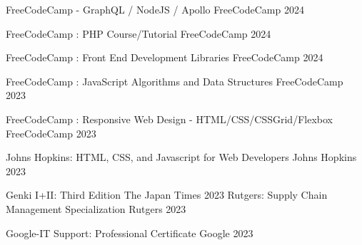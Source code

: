 

\begin{cvhonors}

  \cvhonor
    {FreeCodeCamp - GraphQL / NodeJS / Apollo} %
    {FreeCodeCamp} %
    {} %
    {2024} %

  \cvhonor
    {FreeCodeCamp : PHP Course/Tutorial} %
    {FreeCodeCamp} %
    {} %
    {2024} %

  \cvhonor
    {FreeCodeCamp : Front End Development Libraries} %
    {FreeCodeCamp} %
    {} %
    {2024} %

  \cvhonor
    {FreeCodeCamp : JavaScript Algorithms and Data Structures} %
    {FreeCodeCamp} %
    {} %
    {2023} %

  \cvhonor
    {FreeCodeCamp : Responsive Web Design - HTML/CSS/CSSGrid/Flexbox} %
    {FreeCodeCamp} %
    {} %
    {2023} %

  \cvhonor
    {Johns Hopkins: HTML, CSS, and Javascript for Web Developers} %
    {Johns Hopkins} %
    {} %
    {2023} %

  \cvhonor
  {Genki I+II: Third Edition} %
  { The Japan Times} %
  {} %
  {2023} %
\cvhonor
{Rutgers: Supply Chain Management Specialization} %
{Rutgers} %
{} %
{2023} %

\cvhonor
{Google-IT Support: Professional Certificate} %
{Google} %
{} %
{2023} %


\end{cvhonors}
